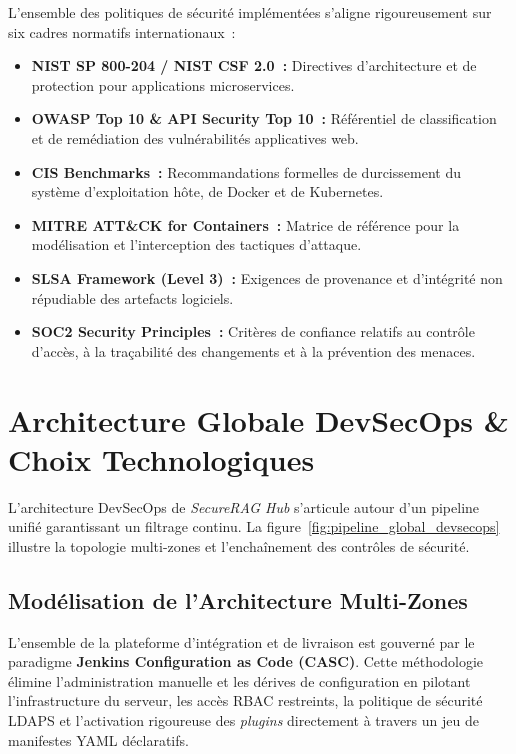 L'ensemble des politiques de sécurité implémentées s'aligne rigoureusement sur six cadres normatifs internationaux~:
\begin{itemize}
    \item \textbf{NIST SP 800-204 / NIST CSF 2.0~:} Directives d'architecture et de protection pour applications microservices.
    \item \textbf{OWASP Top 10 \& API Security Top 10~:} Référentiel de classification et de remédiation des vulnérabilités applicatives web.
    \item \textbf{CIS Benchmarks~:} Recommandations formelles de durcissement du système d'exploitation hôte, de Docker et de Kubernetes.
    \item \textbf{MITRE ATT\&CK for Containers~:} Matrice de référence pour la modélisation et l'interception des tactiques d'attaque.
    \item \textbf{SLSA Framework (Level 3)~:} Exigences de provenance et d'intégrité non répudiable des artefacts logiciels.
    \item \textbf{SOC2 Security Principles~:} Critères de confiance relatifs au contrôle d'accès, à la traçabilité des changements et à la prévention des menaces.
\end{itemize}


\section{Architecture Globale DevSecOps \& Choix Technologiques}
\label{sec:architecture_globale_devsecops}

\vspace{0.3cm}
L'architecture DevSecOps de \textit{SecureRAG Hub} s'articule autour d'un pipeline unifié garantissant un filtrage continu. La figure~\ref{fig:pipeline_global_devsecops} illustre la topologie multi-zones et l'enchaînement des contrôles de sécurité.

\subsection{Modélisation de l'Architecture Multi-Zones}

\vspace{0.3cm}
L'ensemble de la plateforme d'intégration et de livraison est gouverné par le paradigme \textbf{Jenkins Configuration as Code (CASC)}. Cette méthodologie élimine l'administration manuelle et les dérives de configuration en pilotant l'infrastructure du serveur, les accès RBAC restreints, la politique de sécurité LDAPS et l'activation rigoureuse des \textit{plugins} directement à travers un jeu de manifestes YAML déclaratifs. 


